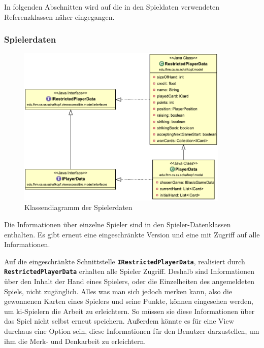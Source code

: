 \documentclass[
							a4paper, 
							11pt, 
							openany, 
							liststotoc,
							parskip=half, 
   							headings=normal
						]{scrreprt}
\begin{document}
{In folgenden Abschnitten wird auf die in den Spieldaten verwendeten Referenzklassen näher eingegangen.
\subsubsection{Spielerdaten} \label{ssse:anwendung_model_player}

\begin{figure}[H]
\begin{center}
    \includegraphics[width=0.9\textwidth]{./pictures/uml/class_diagram/uml_class_playerdata.pdf}
	\caption[Anwendung/Model -- Klassendiagramm Spielerdaten]{Klassendiagramm der Spielerdaten} \label{fig:model_player}
\end{center}
\end{figure}
Die Informationen über einzelne Spieler sind in den Spieler-Datenklassen enthalten.
Es gibt erneut eine eingeschränkte Version und eine mit Zugriff auf alle Informationen.

Auf die eingeschränkte Schnittstelle \textbf{\texttt{IRestrictedPlayerData}}, realisiert durch \textbf{\texttt{Res\-tric\-ted\-Pla\-yer\-Da\-ta}} erhalten alle Spieler Zugriff. Deshalb sind Informationen über den Inhalt der Hand eines Spielers, oder die Einzelheiten des angemeldeten Spiels, nicht zugänglich.\newline
Alles was man sich jedoch merken kann, also die gewonnenen Karten eines Spielers und seine Punkte, können eingesehen werden, um \acs{ki}-Spielern die Arbeit zu erleichtern. So müssen sie diese Informationen über das Spiel nicht selbst erneut speichern.\newline
Außerdem könnte es für eine View durchaus eine Option sein, diese Informationen für den Benutzer darzustellen, um ihm die Merk- und Denkarbeit zu erleichtern.

}
\end{document}
